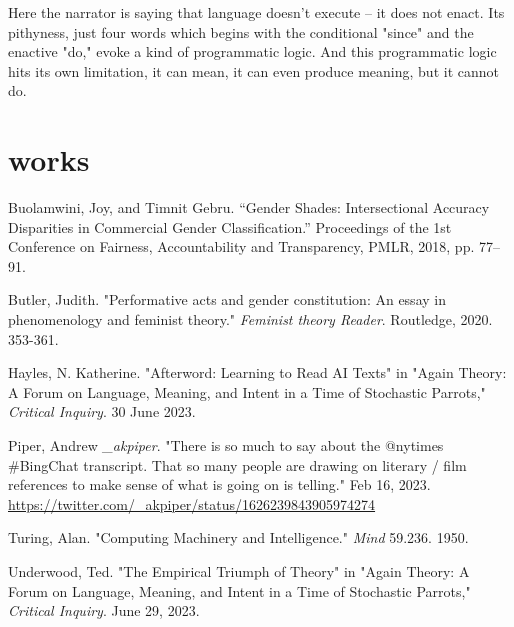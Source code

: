 \documentclass[11pt]{article}
\begin{document}
Here the narrator is saying that language doesn't execute -- it does
not enact. Its pithyness, just four words which begins with the
conditional "since" and the enactive "do," evoke a kind of
programmatic logic. And this programmatic logic hits its own
limitation, it can mean, it can even produce meaning, but it cannot
do. 

\section{works}
\label{sec:org3c5d414}
Buolamwini, Joy, and Timnit Gebru. “Gender Shades: Intersectional
 Accuracy Disparities in Commercial Gender Classification.”
 Proceedings of the 1st Conference on Fairness, Accountability and
 Transparency, PMLR, 2018, pp. 77–91.

Butler, Judith. "Performative acts and gender constitution: An essay
 in phenomenology and feminist theory." \emph{Feminist theory
 Reader}. Routledge, 2020. 353-361.

Hayles, N. Katherine. "Afterword: Learning to Read AI Texts" in "Again
 Theory: A Forum on Language, Meaning, and Intent in a Time of
 Stochastic Parrots," \emph{Critical Inquiry}. 30 June 2023.

Piper, Andrew \emph{\_akpiper}. "There is so much to say about the @nytimes
 \#BingChat transcript. That so many people are drawing on literary /
 film references to make sense of what is going on is telling." Feb
 16, 2023. \url{https://twitter.com/\_akpiper/status/1626239843905974274}

Turing, Alan. "Computing Machinery and Intelligence." \emph{Mind}
 59.236. 1950.

Underwood, Ted. "The Empirical Triumph of Theory" in "Again Theory: A
 Forum on Language, Meaning, and Intent in a Time of Stochastic
 Parrots," \emph{Critical Inquiry}. June 29, 2023.
\end{document}
